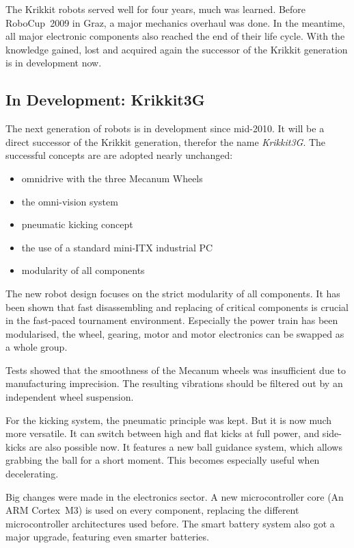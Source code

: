 \documentclass[12pt,a4paper]{article}
\begin{document}
The Krikkit robots served well for four years, much was learned.
Before RoboCup~2009 in Graz, a major mechanics overhaul was done.
In the meantime, all major electronic components also reached the end of their life cycle.
With the knowledge gained, lost and acquired again the successor of the Krikkit generation is in development now.
    

\subsection{In Development: Krikkit3G}

The next generation of robots is in development since mid-2010.
It will be a direct successor of the Krikkit generation, therefor the name \emph{Krikkit3G}.
The successful concepts are are adopted nearly unchanged:

\begin{itemize}
  \item omnidrive with the three Mecanum Wheels
  \item the omni-vision system
  \item pneumatic kicking concept
  \item the use of a standard mini-ITX industrial PC
  \item modularity of all components
\end{itemize}

The new robot design focuses on the strict modularity of all components.
It has been shown that fast disassembling and replacing of critical components is crucial in the fast-paced tournament environment.
Especially the power train has been modularised, the wheel, gearing, motor and motor electronics can be swapped as a whole group.

Tests showed that the smoothness of the Mecanum wheels was insufficient due to manufacturing imprecision.
The resulting vibrations should be filtered out by an independent wheel suspension.


For the kicking system, the pneumatic principle was kept.
But it is now much more versatile. 
It can switch between high and flat kicks at full power, and side-kicks are also possible now.
It features a new ball guidance system, which allows grabbing the ball for a short moment.
This becomes especially useful when decelerating.

Big changes were made in the electronics sector.
A new microcontroller core (An ARM Cortex~M3) is used on every component, replacing the different microcontroller architectures used before.
The smart battery system also got a major upgrade, featuring even smarter batteries.
\end{document}

